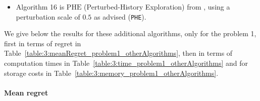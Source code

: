 {\begin{itemize}
    \item Algorithm 16 is
    $\mathrm{PHE}$ (Perturbed-History Exploration) from \cite{KvetonSzepesvari2019}, using a perturbation scale of $0.5$ as advised (\texttt{PHE}).

\end{itemize}

We give below the results for these additional algorithms, only for the problem 1,
first in terms of regret in Table~\ref{table:3:meanRegret_problem1_otherAlgorithms},
then in terms of computation times in Table~\ref{table:3:time_problem1_otherAlgorithms}
and for storage costs in Table~\ref{table:3:memory_problem1_otherAlgorithms}.



\paragraph{Mean regret}

}
